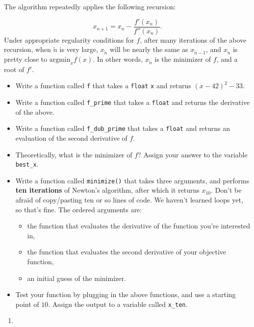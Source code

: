 \documentclass[12pt,krantz2]{krantz}
\providecommand{\tightlist}{%
  \setlength{\itemsep}{0pt}\setlength{\parskip}{0pt}}
\begin{document}
The algorithm repeatedly applies the following recursion:

\begin{equation} 
x_{n+1} = x_{n} - \frac{f'(x_n)}{f''(x_{n})}.
\end{equation}
Under appropriate regularity conditions for \(f\), after many iterations of the above recursion, when \(\tilde{n}\) is very large, \(x_{\tilde{n}}\) will be nearly the same as \(x_{\tilde{n}-1}\), and \(x_{\tilde{n}}\) is pretty close to \(\text{argmin}_x f(x)\). In other words, \(x_{\tilde{n}}\) is the minimizer of \(f\), and a root of \(f'\).

\begin{itemize}
\tightlist
\item
  Write a function called \texttt{f} that takes a \texttt{float} \texttt{x} and returns \((x-42)^2 - 33\).
\item
  Write a function called \texttt{f\_prime} that takes a \texttt{float} and returns the derivative of the above.
\item
  Write a function called \texttt{f\_dub\_prime} that takes a \texttt{float} and returns an evaluation of the second derivative of \(f\).
\item
  Theoretically, what is the minimizer of \(f\)? Assign your answer to the variable \texttt{best\_x}.
\item
  Write a function called \texttt{minimize()} that takes three arguments, and performs \textbf{ten iterations} of Newton's algorithm, after which it returns \(x_{10}\). Don't be afraid of copy/pasting ten or so lines of code. We haven't learned loops yet, so that's fine. The ordered arguments are:

  \begin{itemize}
  \tightlist
  \item
    the function that evaluates the derivative of the function you're interested in,
  \item
    the function that evaluates the second derivative of your objective function,
  \item
    an initial guess of the minimizer.
  \end{itemize}
\item
  Test your function by plugging in the above functions, and use a starting point of \(10\). Assign the output to a variable called \texttt{x\_ten}.
\end{itemize}

\begin{enumerate}
\def\labelenumi{\arabic{enumi}.}
\setcounter{enumi}{1}
\item
\end{enumerate}
\end{document}
